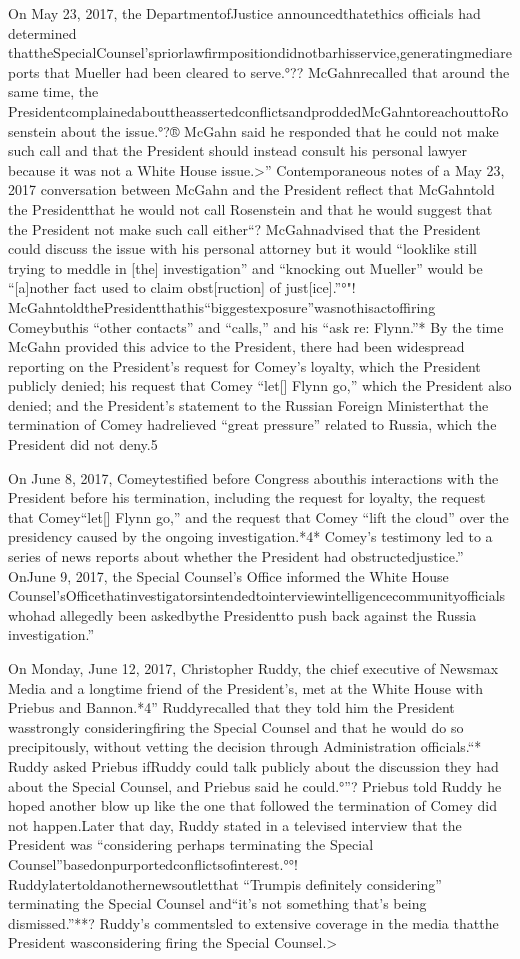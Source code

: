 {On May 23, 2017, the DepartmentofJustice announcedthatethics officials had determined thattheSpecialCounsel’spriorlawfirmpositiondidnotbarhisservice,generatingmediareports that Mueller had been cleared to serve.°??
McGahnrecalled that around the same time, the PresidentcomplainedabouttheassertedconflictsandproddedMcGahntoreachouttoRosenstein about the issue.°?®
McGahn said he responded that he could not make such call and that the President should instead consult his personal lawyer because it was not a White House issue.>”
Contemporaneous notes of a May 23, 2017 conversation between McGahn and the President reflect that McGahntold the Presidentthat he would not call Rosenstein and that he would suggest that the President not make such call either“?
McGahnadvised that the President could discuss the issue with his personal attorney but it would “looklike still trying to meddle in [the] investigation” and “knocking out Mueller” would be “[a]nother fact used to claim obst[ruction] of just[ice].”°"!
McGahntoldthePresidentthathis“biggestexposure”wasnothisactoffiring Comeybuthis “other contacts” and “calls,” and his “ask re: Flynn.”*
By the time McGahn provided this advice to the President, there had been widespread reporting on the President’s request for Comey’s loyalty, which the President publicly denied; his request that Comey “let[] Flynn go,” which the President also denied; and the President’s statement to the Russian Foreign Ministerthat the termination of Comey hadrelieved “great pressure” related to Russia, which the President did not deny.5

On June 8, 2017, Comeytestified before Congress abouthis interactions with the President before his termination, including the request for loyalty, the request that Comey“let[] Flynn go,” and the request that Comey “lift the cloud” over the presidency caused by the ongoing investigation.*4*
Comey’s testimony led to a series of news reports about whether the President had obstructedjustice.”
OnJune 9, 2017, the Special Counsel’s Office informed the White House Counsel’sOfficethatinvestigatorsintendedtointerviewintelligencecommunityofficialswhohad allegedly been askedbythe Presidentto push back against the Russia investigation.”

On Monday, June 12, 2017, Christopher Ruddy, the chief executive of Newsmax Media and a longtime friend of the President’s, met at the White House with Priebus and Bannon.*4”
Ruddyrecalled that they told him the President wasstrongly consideringfiring the Special Counsel and that he would do so precipitously, without vetting the decision through Administration officials.“*
Ruddy asked Priebus ifRuddy could talk publicly about the discussion they had about the Special Counsel, and Priebus said he could.°”?
Priebus told Ruddy he hoped another blow up like the one that followed the termination of Comey did not happen.Later that day, Ruddy stated in a televised interview that the President was “considering perhaps terminating the Special Counsel”basedonpurportedconflictsofinterest.°°!
Ruddylatertoldanothernewsoutletthat “Trumpis definitely considering” terminating the Special Counsel and“it’s not something that’s being dismissed.”**?
Ruddy’s commentsled to extensive coverage in the media thatthe President wasconsidering firing the Special Counsel.>

}
